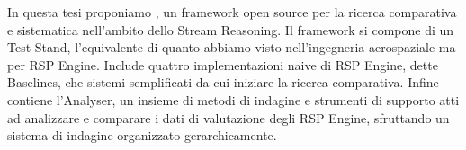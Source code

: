 In questa tesi proponiamo \namens, un framework open source per la ricerca comparativa e sistematica nell'ambito dello Stream Reasoning. Il framework si compone di un Test Stand, l'equivalente di quanto abbiamo visto nell'ingegneria aerospaziale ma per RSP Engine. Include quattro implementazioni naive di RSP Engine, dette Baselines, che sistemi semplificati da cui iniziare la ricerca comparativa. Infine \name contiene l'Analyser, un insieme di metodi di indagine e strumenti di supporto atti ad analizzare e comparare i dati di valutazione degli RSP Engine, sfruttando un sistema di indagine organizzato gerarchicamente.
